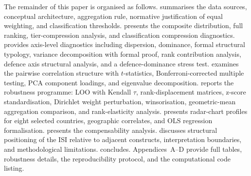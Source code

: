 The remainder of this paper is organised as follows.
 summarises the data sources, conceptual
architecture, aggregation rule, normative justification of equal
weighting, and classification thresholds.
 presents the composite distribution,
full ranking, tier-compression analysis, and classification
compression diagnostics.
 provides axis-level diagnostics including
dispersion, dominance, formal structural typology, variance
decomposition with formal proof, rank contribution analysis, defence
axis structural analysis, and a defence-dominance stress test.
 examines the pairwise correlation structure
with $t$-statistics, Bonferroni-corrected multiple testing, PCA
component loadings, and eigenvalue decomposition.
 reports the robustness programme: LOO with
Kendall $\tau$, rank-displacement matrices, z-score standardisation,
Dirichlet weight perturbation, winsorisation, geometric-mean
aggregation comparison, and rank-elasticity analysis.
 presents radar-chart profiles for eight
selected countries, geographic correlates, and OLS regression
formalisation.
 presents the compensability analysis.
 discusses structural positioning of the ISI
relative to adjacent constructs, interpretation boundaries, and
methodological limitations.
 concludes.
Appendices~A--D provide full tables, robustness details, the
reproducibility protocol, and the computational code listing.
